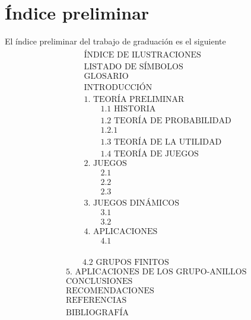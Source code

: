 \documentclass[12pt,letterpaper,titlepage]{article}
\begin{document}
\newpage

\section{Índice preliminar}
El índice preliminar del trabajo de graduación es el siguiente
\begin{align*}
&\text{ÍNDICE DE ILUSTRACIONES}\\
&\text{LISTADO DE SÍMBOLOS}\\
&\text{GLOSARIO}\\
&\text{INTRODUCCIÓN}\\
&\text{1. TEORÍA PRELIMINAR}\\
&\qquad\text{1.1 HISTORIA}\\
&\qquad\text{1.2 TEORÍA DE PROBABILIDAD}\\
&\qquad\text{1.2.1}\\
&\qquad\text{1.3 TEORÍA DE LA UTILIDAD}\\
&\qquad\text{1.4 TEORÍA DE JUEGOS}\\
&\text{2. JUEGOS }\\
&\qquad\text{2.1 }\\
&\qquad\text{2.2 }\\
&\qquad\text{2.3 }\\
&\text{3. JUEGOS DINÁMICOS }\\
&\qquad\text{3.1 }\\
&\qquad\text{3.2 }\\
&\text{4. APLICACIONES }\\
&\qquad\text{4.1}\\
\end{align*}

\newpage
\begin{align*}
&\qquad\text{4.2 GRUPOS FINITOS}\\
&\text{5. APLICACIONES DE LOS GRUPO-ANILLOS }\\
&\text{CONCLUSIONES}\\
&\text{RECOMENDACIONES}\\ %
&\text{REFERENCIAS}\\ %
&\text{BIBLIOGRAFÍA} %
\end{align*}

\newpage
\end{document}
